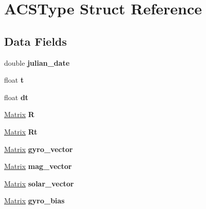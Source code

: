 \hypertarget{struct_a_c_s_type}{}\section{A\+C\+S\+Type Struct Reference}
\label{struct_a_c_s_type}
\subsection*{Data Fields}
\begin{DoxyCompactItemize}
\item 
\mbox{\label{struct_a_c_s_type_a511e2e3264766d560a8f6cb81ac45fc9}} 
double {\bfseries julian\+\_\+date}
\item 
\mbox{\label{struct_a_c_s_type_afea36502e9d227ff62c5fb2719a246f2}} 
float {\bfseries t}
\item 
\mbox{\label{struct_a_c_s_type_a778e38aa889751afffa2dea6b803e67a}} 
float {\bfseries dt}
\item 
\mbox{\label{struct_a_c_s_type_a72851c393b49a2b488e51a678b90135b}} 
\mbox{\hyperlink{struct___matrix}{Matrix}} {\bfseries R}
\item 
\mbox{\label{struct_a_c_s_type_a9b4fd46706c2ce0ad8a2df8038ac915e}} 
\mbox{\hyperlink{struct___matrix}{Matrix}} {\bfseries Rt}
\item 
\mbox{\label{struct_a_c_s_type_a6db622f43cefd0fe0f05ddbb5553ce71}} 
\mbox{\hyperlink{struct___matrix}{Matrix}} {\bfseries gyro\+\_\+vector}
\item 
\mbox{\label{struct_a_c_s_type_a4b82b0a178354dcc8761b1bc5d9e3e90}} 
\mbox{\hyperlink{struct___matrix}{Matrix}} {\bfseries mag\+\_\+vector}
\item 
\mbox{\label{struct_a_c_s_type_a2565c37ca09278f1f6e2405328e94bc8}} 
\mbox{\hyperlink{struct___matrix}{Matrix}} {\bfseries solar\+\_\+vector}
\item 
\mbox{\label{struct_a_c_s_type_a4041a720dac4049e6c883ed9b0d654ba}} 
\mbox{\hyperlink{struct___matrix}{Matrix}} {\bfseries gyro\+\_\+bias}

\end{DoxyCompactItemize}
